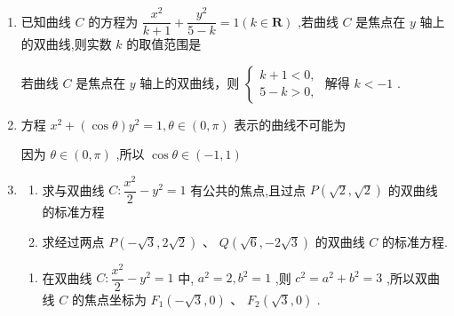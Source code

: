 \begin{enumerate}
\begin{jieda}
        又 $\left| {P{F}_{2}}\right|  \geq  c - a = 2$ ,故 $\left| {P{F}_{2}}\right| = 17$
    \end{jieda}
    \item 已知曲线 $C$ 的方程为 $\dfrac{{x}^{2}}{k + 1} + \dfrac{{y}^{2}}{5 - k} = 1\left( {k \in  \mathbf{R}}\right)$ ,若曲线 $C$ 是焦点在 $y$ 轴上的双曲线,则实数 $k$ 的取值范围是
    \begin{jieda}
        若曲线 $C$ 是焦点在 $y$ 轴上的双曲线，则 $\left\{  \begin{array}{l} k + 1 < 0, \\  5 - k > 0, \end{array}\right.$ 解得 $k <  - 1$ .
    \end{jieda}
    \item 方程 ${x}^{2} + \left( {\cos \theta }\right) {y}^{2} = 1,\theta  \in  \left( {0,\pi }\right)$ 表示的曲线不可能为
    \begin{jieda}
        因为 $\theta  \in  \left( {0,\pi }\right)$ ,所以 $\cos \theta  \in  \left( {-1,1}\right)$
    \end{jieda}
    \item 
    \begin{enumerate}
        \item 求与双曲线 $C : \dfrac{{x}^{2}}{2} - {y}^{2} = 1$ 有公共的焦点,且过点 $P\left( {\sqrt{2},\sqrt{2}}\right)$ 的双曲线的标准方程
        \item 求经过两点 $P\left( {-\sqrt{3},2\sqrt{2}}\right)$ 、 $Q\left( {\sqrt{6}, - 2\sqrt{3}}\right)$ 的双曲线 $C$ 的标准方程.
    \end{enumerate}
    \begin{jieda}
        \begin{enumerate}
            \item 在双曲线 $C : \dfrac{{x}^{2}}{2} - {y}^{2} = 1$ 中, ${a}^{2} = 2,{b}^{2} = 1$ ,则 ${c}^{2} = {a}^{2} + {b}^{2} = 3$ ,所以双曲线 $C$ 的焦点坐标为 ${F}_{1}\left( {-\sqrt{3},0}\right) \text{ 、 }{F}_{2}\left( {\sqrt{3},0}\right)$ .
            

\end{enumerate}
\end{jieda}
\end{enumerate}
